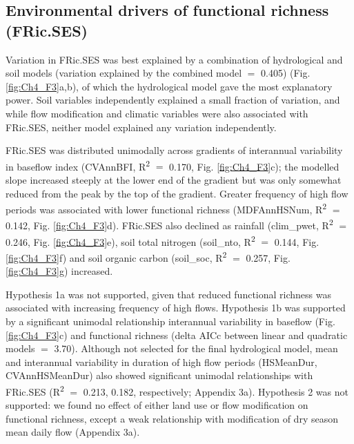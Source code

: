 \documentclass[openright,12pt,a4paper]{memoir}
\begin{document}
\subsection{Environmental drivers of functional richness (FRic.SES)}
Variation in FRic.SES was best explained by a combination of hydrological and soil models (variation explained by the combined model $=$ 0.405) (Fig. \ref{fig:Ch4_F3}a,b), of which the hydrological model gave the most explanatory power. Soil variables independently explained a small fraction of variation, and while flow modification and climatic variables were also associated with FRic.SES, neither model explained any variation independently. 

FRic.SES was distributed unimodally across gradients of interannual variability in baseflow index (CVAnnBFI, R\textsuperscript{2}  $=$ 0.170, Fig. \ref{fig:Ch4_F3}c); the modelled slope increased steeply at the lower end of the gradient but was only somewhat reduced from the peak by the top of the gradient. Greater frequency of high flow periods was associated with lower functional richness (MDFAnnHSNum, R\textsuperscript{2}  $=$ 0.142, Fig. \ref{fig:Ch4_F3}d). FRic.SES also declined as rainfall (clim\_pwet, R\textsuperscript{2}  $=$ 0.246, Fig. \ref{fig:Ch4_F3}e), soil total nitrogen (soil\_nto, R\textsuperscript{2}  $=$ 0.144, Fig. \ref{fig:Ch4_F3}f) and soil organic carbon (soil\_soc, R\textsuperscript{2}  $=$ 0.257, Fig. \ref{fig:Ch4_F3}g) increased. 

Hypothesis 1a was not supported, given that reduced functional richness was associated with increasing frequency of high flows. Hypothesis 1b was supported by a significant unimodal relationship interannual variability in baseflow (Fig. \ref{fig:Ch4_F3}c) and functional richness (delta AICc between linear and quadratic models $=$ 3.70). Although not selected for the final hydrological model, mean and interannual variability in duration of high flow periods (HSMeanDur, CVAnnHSMeanDur) also showed significant unimodal relationships with FRic.SES (R\textsuperscript{2}  $=$ 0.213, 0.182, respectively; Appendix 3a). Hypothesis 2 was not supported: we found no effect of either land use or flow modification on functional richness, except a weak relationship with modification of dry season mean daily flow (Appendix 3a). 
\end{document}
